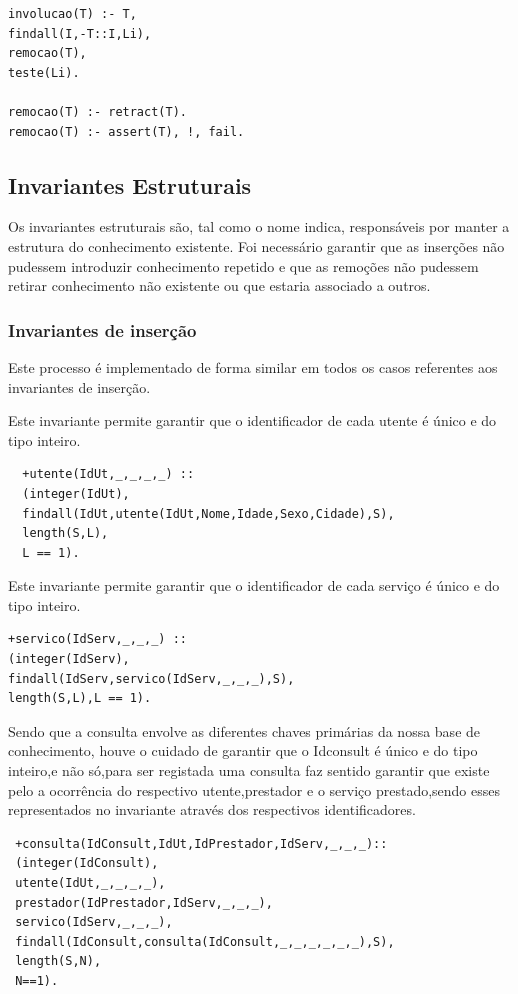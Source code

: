 \documentclass[25pt]{article}
\begin{document}
\begin{lstlisting}
involucao(T) :- T,
findall(I,-T::I,Li),
remocao(T),
teste(Li).

remocao(T) :- retract(T).
remocao(T) :- assert(T), !, fail.
\end{lstlisting}

\subsection{Invariantes Estruturais}
Os invariantes estruturais são, tal como o nome indica, responsáveis por manter a estrutura do conhecimento existente. Foi
necessário garantir que as inserções não pudessem introduzir conhecimento repetido e que as remoções não pudessem retirar
conhecimento não existente ou que estaria associado a outros.

\subsubsection{Invariantes de inserção}
Este processo é implementado de forma similar em todos os casos referentes aos invariantes de inserção.\newline



Este invariante permite garantir que o identificador de cada utente é  único e do tipo inteiro.

\begin{lstlisting}
  +utente(IdUt,_,_,_,_) ::
  (integer(IdUt),
  findall(IdUt,utente(IdUt,Nome,Idade,Sexo,Cidade),S),
  length(S,L),
  L == 1).
\end{lstlisting}


Este invariante permite garantir que o identificador de cada serviço é  único e do tipo inteiro.\\

\begin{lstlisting}
+servico(IdServ,_,_,_) ::
(integer(IdServ),
findall(IdServ,servico(IdServ,_,_,_),S),
length(S,L),L == 1).
\end{lstlisting}

Sendo que a consulta envolve as diferentes chaves primárias da nossa base de conhecimento, houve o cuidado de garantir que o Idconsult é único e do tipo inteiro,e não só,para ser registada uma consulta faz sentido garantir que existe pelo  a ocorrência do respectivo utente,prestador e o serviço prestado,sendo esses representados no invariante  através dos respectivos identificadores.\\
\begin{lstlisting}
 +consulta(IdConsult,IdUt,IdPrestador,IdServ,_,_,_)::
 (integer(IdConsult),
 utente(IdUt,_,_,_,_),
 prestador(IdPrestador,IdServ,_,_,_),
 servico(IdServ,_,_,_),
 findall(IdConsult,consulta(IdConsult,_,_,_,_,_,_),S),
 length(S,N),
 N==1).
\end{lstlisting}
\end{document}
